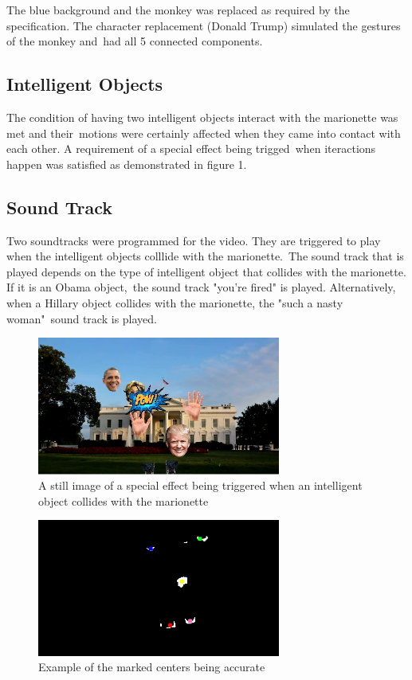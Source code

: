 \documentclass[12pt,a4paper]{article}
\begin{document}
      The blue background and the monkey was replaced as required by the specification. The character replacement (Donald Trump) simulated the gestures of the monkey and\
      had all 5 connected components.

      \subsection{Intelligent Objects}

      The condition of having two intelligent objects interact with the marionette was met and their\
      motions were certainly affected when they came into contact with each other. A requirement of a special effect being trigged\
      when iteractions happen was satisfied as demonstrated in figure 1.

      \subsection{Sound Track}

      Two soundtracks were programmed for the video. They are triggered to play when the intelligent objects colllide with the marionette.\
      The sound track that is played depends on the type of intelligent object that collides with the marionette. If it is an Obama object,\
      the sound track "you're fired" is played. Alternatively, when a Hillary object collides with the marionette, the "such a nasty woman"\
      sound track is played.

    \begin{figure}[h]
      \caption{A still image of a special effect being triggered when an intelligent object collides with the marionette}
      \includegraphics[width=8cm]{pow}
    \end{figure}

    \begin{figure}[h]
      \caption{Example of the marked centers being accurate}
      \includegraphics[width=8cm]{192}
    \end{figure}
\end{document}
